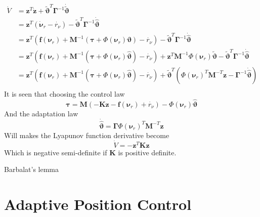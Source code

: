 \documentclass[12pt,a4]{article}
\begin{document}
\begin{align}
	\dot{V} & = \bm{z}^T\dot{\bm{z}}
	+ \bm{\tilde{\vartheta}} ^T\bm{\Gamma}^{-1}\bm{\dot{\tilde{\vartheta}}}                                                                         \\
	        & = \bm{z}^T\left(\bm{\dot{\nu}}_r  - \dot{r_{\nu}}\right)
	- \bm{\tilde{\vartheta}} ^T\bm{\Gamma}^{-1}\bm{\dot{\hat{\vartheta}}}                                                                           \\
	        & = \bm{z}^T\left(\bm{f}(\bm{\nu}_r) + \bm{M}^{-1}\left(\bm{\tau} + \Phi(\bm{\nu}_r )\bm{\vartheta}\right)  - \dot{r_{\nu}}\right)
	- \bm{\tilde{\vartheta}} ^T\bm{\Gamma}^{-1}\bm{\dot{\hat{\vartheta}}}                                                                           \\
	        & = \bm{z}^T\left(\bm{f}(\bm{\nu}_r) + \bm{M}^{-1}\left(\bm{\tau} + \Phi(\bm{\nu}_r )\bm{\hat{\vartheta}}\right) - \dot{r_{\nu}}\right)
	+ \bm{z}^T\bm{M}^{-1} \Phi(\bm{\nu}_r )\bm{\tilde{\vartheta}}
	- \bm{\tilde{\vartheta}} ^T\bm{\Gamma}^{-1}\bm{\dot{\hat{\vartheta}}}                                                                           \\
	        & = \bm{z}^T\left(\bm{f}(\bm{\nu}_r) + \bm{M}^{-1}\left(\bm{\tau} + \Phi(\bm{\nu}_r )\bm{\hat{\vartheta}}\right) - \dot{r_{\nu}}\right)
	+ \bm{\tilde{\vartheta}}^T \left(\Phi(\bm{\nu}_r )^T \bm{M}^{-T} \bm{z} -\bm{\Gamma}^{-1}\bm{\dot{\hat{\vartheta}}}  \right)                    \\
\end{align}
It is seen that choosing the control law
\begin{equation}
	\bm{\tau} = \bm{M} \left( -\bm{K}\bm{z} -\bm{f}(\bm{\nu}_r) +\dot{r_{\nu}} \right) -\Phi(\bm{\nu}_r )\bm{\hat{\vartheta}}
\end{equation}
And the adaptation law
\begin{equation}
	\bm{\dot{\hat{\vartheta}}} = \bm{\Gamma} \Phi(\bm{\nu}_r )^T \bm{M}^{-T} \bm{z}
\end{equation}
Will makes the Lyapunov function derivative become
\begin{equation}
	\dot{V} = -\bm{z}^T \bm{K} \bm{z}
\end{equation}
Which is negative semi-definite if $\bm{K}$ is positive definite.

Barbalat’s lemma

\section{Adaptive Position Control}
\end{document}
